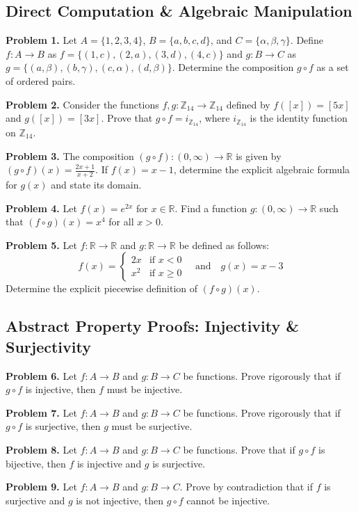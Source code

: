\documentclass[11pt, letterpaper]{article}
\theoremstyle{definition}
\theoremstyle{remark}
\newcommand{\R}{\mathbb{R}}
\newcommand{\Z}{\mathbb{Z}}
\begin{document}
\subsection{Direct Computation \& Algebraic Manipulation}

\textbf{Problem 1.} Let $A = \{1, 2, 3, 4\}$, $B = \{a, b, c, d\}$, and $C = \{\alpha, \beta, \gamma\}$. Define $f: A \to B$ as $f = \{(1, c), (2, a), (3, d), (4, c)\}$ and $g: B \to C$ as $g = \{(a, \beta), (b, \gamma), (c, \alpha), (d, \beta)\}$. Determine the composition $g \circ f$ as a set of ordered pairs.

\textbf{Problem 2.} Consider the functions $f, g: \Z_{14} \to \Z_{14}$ defined by $f([x]) = [5x]$ and $g([x]) = [3x]$. Prove that $g \circ f = i_{\Z_{14}}$, where $i_{\Z_{14}}$ is the identity function on $\Z_{14}$.

\textbf{Problem 3.} The composition $(g \circ f): (0, \infty) \to \R$ is given by $(g \circ f)(x) = \frac{2x + 1}{x + 2}$. If $f(x) = x - 1$, determine the explicit algebraic formula for $g(x)$ and state its domain.

\textbf{Problem 4.} Let $f(x) = e^{2x}$ for $x \in \R$. Find a function $g: (0, \infty) \to \R$ such that $(f \circ g)(x) = x^4$ for all $x > 0$.

\textbf{Problem 5.} Let $f: \R \to \R$ and $g: \R \to \R$ be defined as follows:
\[
f(x) = 
\begin{cases} 
2x & \text{if } x < 0 \\ 
x^2 & \text{if } x \ge 0 
\end{cases}
\quad \text{and} \quad
g(x) = x - 3
\]
Determine the explicit piecewise definition of $(f \circ g)(x)$.

\subsection{Abstract Property Proofs: Injectivity \& Surjectivity}

\textbf{Problem 6.} Let $f: A \to B$ and $g: B \to C$ be functions. Prove rigorously that if $g \circ f$ is injective, then $f$ must be injective.

\textbf{Problem 7.} Let $f: A \to B$ and $g: B \to C$ be functions. Prove rigorously that if $g \circ f$ is surjective, then $g$ must be surjective.

\textbf{Problem 8.} Let $f: A \to B$ and $g: B \to C$ be functions. Prove that if $g \circ f$ is bijective, then $f$ is injective and $g$ is surjective.

\textbf{Problem 9.} Let $f: A \to B$ and $g: B \to C$. Prove by contradiction that if $f$ is surjective and $g$ is not injective, then $g \circ f$ cannot be injective.
\end{document}
